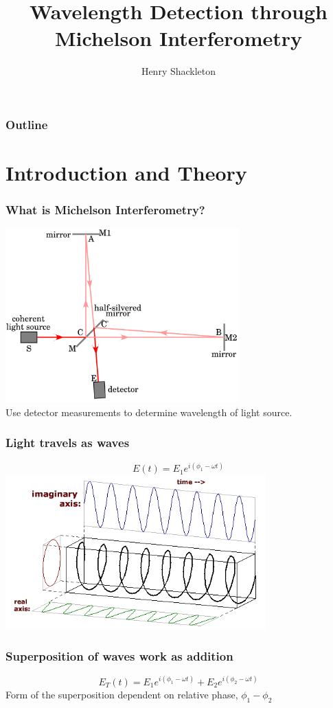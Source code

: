 \documentclass{beamer}
\title[Michelson Interferometry]{Wavelength Detection through Michelson Interferometry}
\author{Henry Shackleton}
\begin{document}
\titlepage

\begin{frame}
  \frametitle{Outline}
\tableofcontents
\end{frame}

\section{Introduction and Theory}


\begin{frame}
  \frametitle{What is Michelson Interferometry?}
  \includegraphics[width=9cm]{basic_interferometer.png}
  \pause
  \\
  Use detector measurements to determine wavelength of light source.
\end{frame}

\begin{frame}
  \frametitle{Light travels as waves}
  \begin{equation*}
    E(t) = E_1 e^{i\left(\phi_1 - \omega t\right)}
  \end{equation*}
  \hspace{5pt}\includegraphics[width=10cm]{complex.png}
\end{frame}

\begin{frame}
  \frametitle{Superposition of waves work as addition}
  \begin{equation*}
    E_T(t) = E_1 e^{i(\phi_1 - \omega t)} + E_2 e^{i(\phi_2 - \omega t)}
  \end{equation*}
  \pause
  Form of the superposition dependent on relative phase, $\phi_1 - \phi_2$
\end{frame}
\end{document}
